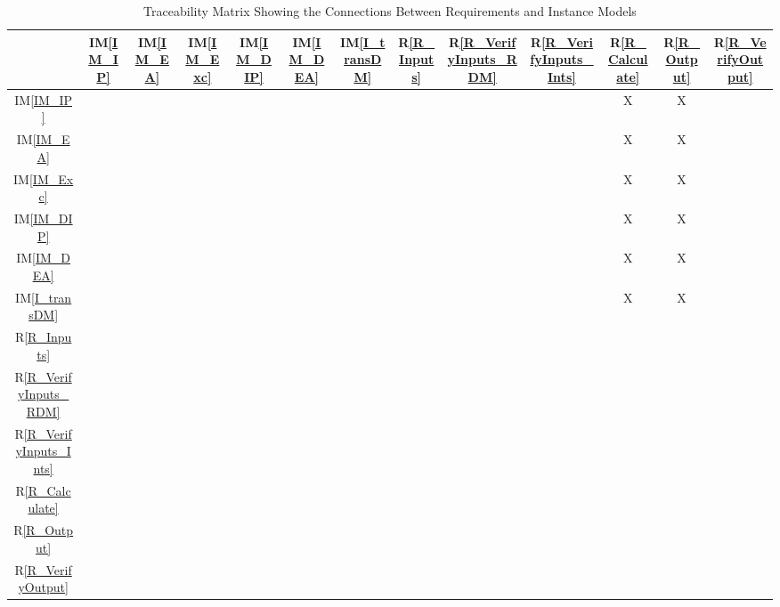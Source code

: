 \documentclass[12pt]{article}
\newcommand{\iref}[1]{IM\ref{#1}}
\newcommand{\rref}[1]{R\ref{#1}}
\begin{document}
\begin{table}[h!]
\centering
\begin{tabular}{|c|c|c|c|c|c|c|c|c|c|c|c|c|}
\hline
	& \iref{IM_IP}& \iref{IM_EA}& \iref{IM_Exc}& \iref{IM_DIP}& \iref{IM_DEA}& \iref{I_transDM}& \rref{R_Inputs}& \rref{R_VerifyInputs_RDM}& \rref{R_VerifyInputs_Ints} & \rref{R_Calculate} & \rref{R_Output} & \rref{R_VerifyOutput}\\
\hline
\iref{IM_IP}            & & & & & & &  & & & X& X&\\ \hline
\iref{IM_EA}            & & & & & & &  & & & X& X&\\ \hline
\iref{IM_Exc}          & & & & & & & & & & X& X&\\ \hline
\iref{IM_DIP}          & & & & & & &  & & & X& X&\\ \hline
\iref{IM_DEA}          & & & & & & &  & & & X& X&\\ \hline
\iref{I_transDM}          & & & & & & &  & & & X& X&\\ \hline
\rref{R_Inputs}     & & & & & & & & & & &&\\ \hline
\rref{R_VerifyInputs_RDM}    & & & & & & & & & & & &\\ \hline
\rref{R_VerifyInputs_Ints}   & & & & & & & & & & & &\\ \hline
\rref{R_Calculate}  & & & & & & &  & & & & &\\ \hline
\rref{R_Output}     & & & & & & & & & & & &\\ \hline 
\rref{R_VerifyOutput}       & & & & & & & & & & & &\\  
\hline
\end{tabular}
\caption{Traceability Matrix Showing the Connections Between Requirements and Instance Models}
\label{Table:R_trace}
\end{table}

\end{document}
